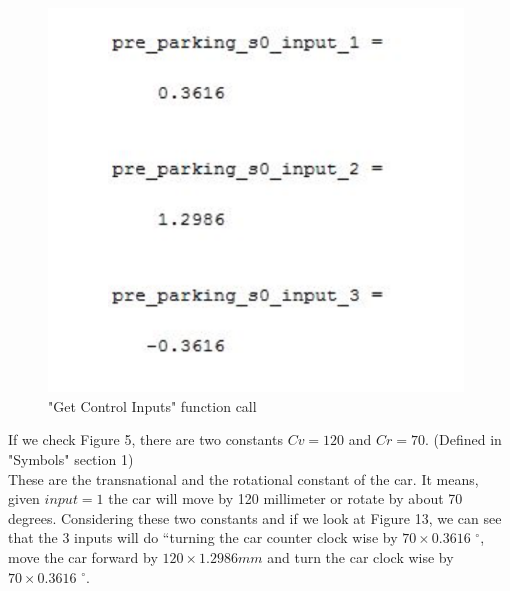 \documentclass[12pt, letterpaper]{amsart} %
\numberwithin{equation}{section}
\begin{document}
\begin{figure}[h!]
\includegraphics[width=110mm]{fig_13.png}
\caption{"Get Control Inputs" function call}
\label{fig:figure13}	
\end{figure}

If we check Figure 5, there are two constants $Cv=120$ 
and $Cr=70$. (Defined in "Symbols" section 1)
\\These are the transnational and the rotational constant of the car. It means, given  
$input=1$ the car will move by 120 millimeter or rotate by about 70 degrees. 
Considering these two constants and if we look at Figure 13, we can see that 
the 3 inputs will do “turning the car counter clock 
wise by $70 \times 0.3616$ $^{\circ}$, move the car forward by 
$120 \times 1.2986 mm$ and turn the car clock wise by $70 \times 0.3616$ $^{\circ}$. 
\newpage
\end{document}
